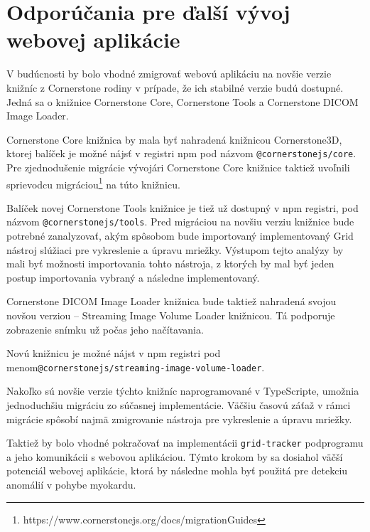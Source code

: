 \chapter {Odporúčania pre ďalší vývoj webovej aplikácie}
V budúcnosti by bolo vhodné zmigrovať webovú aplikáciu na novšie verzie knižníc z Cornerstone rodiny v prípade, že ich stabilné verzie budú dostupné. Jedná sa o knižnice Cornerstone Core, Cornerstone Tools a Cornerstone DICOM Image Loader.

Cornerstone Core knižnica by mala byť nahradená knižnicou Cornerstone3D, ktorej balíček je možné nájsť v registri npm pod názvom \newline \texttt{@cornerstonejs/core}. Pre zjednodušenie migrácie vývojári Cornerstone Core knižnice taktiež uvoľnili sprievodcu migráciou\footnote{https://www.cornerstonejs.org/docs/migrationGuides} na túto knižnicu.

Balíček novej Cornerstone Tools knižnice je tiež už dostupný v npm registri, pod názvom \texttt{@cornerstonejs/tools}. Pred migráciou na novšiu verziu knižnice bude potrebné zanalyzovať, akým spôsobom bude importovaný implementovaný Grid nástroj slúžiaci pre vykreslenie a úpravu mriežky. Výstupom tejto analýzy by mali byť možnosti importovania tohto nástroja, z ktorých by mal byť jeden postup importovania vybraný a následne implementovaný.

Cornerstone DICOM Image Loader knižnica bude taktiež nahradená svojou novšou verziou -- Streaming Image Volume Loader knižnicou. Tá podporuje zobrazenie snímku už počas jeho načítavania.

\clearpage

Novú knižnicu je možné nájst v npm registri pod menom\newline \texttt{@cornerstonejs/streaming-image-volume-loader}.

Nakoľko sú novšie verzie týchto knižníc naprogramované v TypeScripte, umožnia jednoduchšiu migráciu zo súčasnej implementácie. Väčšiu časovú záťaž v rámci migrácie spôsobí najmä zmigrovanie nástroja pre vykreslenie a úpravu mriežky.

Taktiež by bolo vhodné pokračovať na implementácii \texttt{grid-tracker} podprogramu a jeho komunikácii s webovou aplikáciou. Týmto krokom by sa dosiahol väčší potenciál webovej aplikácie, ktorá by následne mohla byť použitá pre detekciu anomálií v pohybe myokardu.